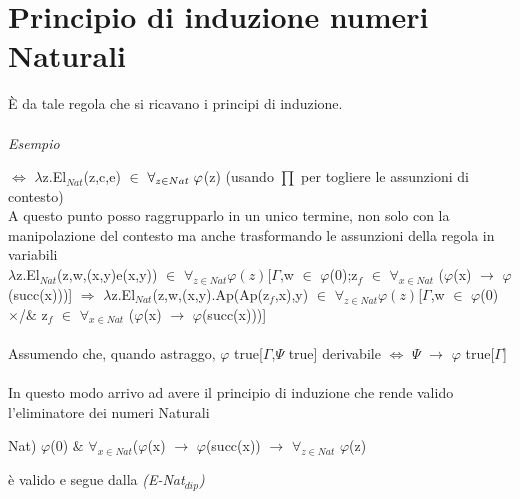 \section{Principio di induzione numeri Naturali}
\label{sec:principio-di-induzione-numeri-Naturali}
\begin{prooftree}
\end{prooftree}
\noindent
\`E da tale regola che si ricavano i principi di induzione.\\\\
\noindent
\textit{Esempio}
\begin{prooftree}
\end{prooftree}
\noindent
$\Leftrightarrow$ $\lambda$z.El$_{Nat}$(z,c,e) $\in$ $\forall_{z \in Nat} \hspace{0.1cm}\varphi$(z) (usando {\scriptsize $\prod$} per togliere le assunzioni di contesto)\\
A questo punto posso raggrupparlo in un unico termine, non solo con la manipolazione del contesto ma anche trasformando le assunzioni della regola in variabili\\
$\lambda$z.El$_{Nat}$(z,w,(x,y)e(x,y)) $\in$ $\forall_{z \in Nat} \varphi(z)$[$\Gamma$,w $\in$ $\varphi$(0);z$_f$ $\in$ $\forall_{x \in Nat}$ ($\varphi$(x) $\rightarrow$ $\varphi$(succ(x)))] $\Rightarrow$
$\lambda$z.El$_{Nat}$(z,w,(x,y).Ap(Ap(z$_f$,x),y) $\in$ $\forall_{z \in Nat} \varphi(z)$[$\Gamma$,w $\in$ $\varphi$(0) $\times$/$\&$ z$_f$ $\in$ $\forall_{x \in Nat}$ ($\varphi$(x) $\rightarrow$ $\varphi$(succ(x)))]\\\\
\noindent
Assumendo che, quando astraggo, $\varphi$ true[$\Gamma$,$\Psi$ true] derivabile $\Leftrightarrow$ $\Psi$ $\rightarrow$ $\varphi$ true[$\Gamma$]\\\\
\noindent
In questo modo arrivo ad avere il principio di induzione che rende valido l'eliminatore dei numeri Naturali\\
\begin{center}Nat) $\varphi$(0) $\&$ $\forall_{x \in Nat}$($\varphi$(x) $\rightarrow$ $\varphi$(succ(x)) $\rightarrow$ $\forall_{z \in Nat}$ $\varphi$(z)\end{center}
\`e valido e segue dalla \textit{(E-Nat$_{dip}$)}

